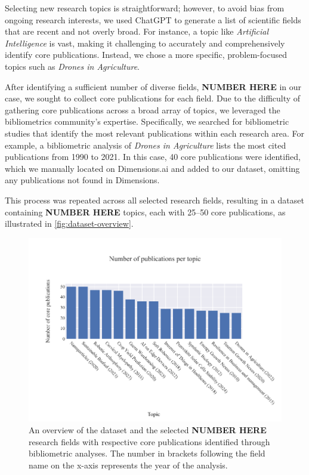 Selecting new research topics is straightforward; however, to avoid bias from ongoing research interests, we used ChatGPT to generate a list of scientific fields that are recent and not overly broad. For instance, a topic like \textit{Artificial Intelligence} is vast, making it challenging to accurately and comprehensively identify core publications. Instead, we chose a more specific, problem-focused topics such as \textit{Drones in Agriculture}.

After identifying a sufficient number of diverse fields, \textbf{NUMBER HERE} in our case, we sought to collect core publications for each field. Due to the difficulty of gathering core publications across a broad array of topics, we leveraged the bibliometrics community’s expertise. Specifically, we searched for bibliometric studies that identify the most relevant publications within each research area. For example, a bibliometric analysis of \textit{Drones in Agriculture} \autocite{Rejeb2022} lists the most cited publications from 1990 to 2021. In this case, 40 core publications were identified, which we manually located on Dimensions.ai and added to our dataset, omitting any publications not found in Dimensions.

This process was repeated across all selected research fields, resulting in a dataset containing \textbf{NUMBER HERE} topics, each with 25–50 core publications, as illustrated in \autoref{fig:dataset-overview}.
\begin{figure}
	\centering	
	\includegraphics{pics/dataset-overview.pdf}
	\caption[Dataset overview of the research topics]{An overview of the dataset and the selected \textbf{NUMBER HERE} research fields with respective core publications identified through bibliometric analyses. The number in brackets following the field name on the x-axis represents the year of the analysis.}
	\label{fig:dataset-overview}
\end{figure}


